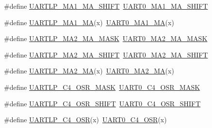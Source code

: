 \begin{DoxyCompactItemize}
\item 
\#define \hyperlink{group___backward___compatibility___symbols_ga62055de0c9859d4d9308b092e5fee5e9}{U\+A\+R\+T\+L\+P\+\_\+\+M\+A1\+\_\+\+M\+A\+\_\+\+S\+H\+I\+FT}~\hyperlink{group___u_a_r_t0___register___masks_ga97f0146ebe2278bfbb80f350bcb8f238}{U\+A\+R\+T0\+\_\+\+M\+A1\+\_\+\+M\+A\+\_\+\+S\+H\+I\+FT}
\item 
\#define \hyperlink{group___backward___compatibility___symbols_gae1c043e76d3e412ec723a033513ceac6}{U\+A\+R\+T\+L\+P\+\_\+\+M\+A1\+\_\+\+MA}(x)~\hyperlink{group___u_a_r_t0___register___masks_gad868c0319c33d444b3aac8c88f4132d3}{U\+A\+R\+T0\+\_\+\+M\+A1\+\_\+\+MA}(x)
\item 
\#define \hyperlink{group___backward___compatibility___symbols_gaf7ea6dd269e7c9e321d53599db756e75}{U\+A\+R\+T\+L\+P\+\_\+\+M\+A2\+\_\+\+M\+A\+\_\+\+M\+A\+SK}~\hyperlink{group___u_a_r_t0___register___masks_ga92464fbb6ee7662411228e760fab58d3}{U\+A\+R\+T0\+\_\+\+M\+A2\+\_\+\+M\+A\+\_\+\+M\+A\+SK}
\item 
\#define \hyperlink{group___backward___compatibility___symbols_ga85f77220a0349e3a2862f9d08f670133}{U\+A\+R\+T\+L\+P\+\_\+\+M\+A2\+\_\+\+M\+A\+\_\+\+S\+H\+I\+FT}~\hyperlink{group___u_a_r_t0___register___masks_gab09c5cd573077ea52dd66656d8b4157d}{U\+A\+R\+T0\+\_\+\+M\+A2\+\_\+\+M\+A\+\_\+\+S\+H\+I\+FT}
\item 
\#define \hyperlink{group___backward___compatibility___symbols_ga49450a92c02a7d5af71ec00dc7e8ab3f}{U\+A\+R\+T\+L\+P\+\_\+\+M\+A2\+\_\+\+MA}(x)~\hyperlink{group___u_a_r_t0___register___masks_gaa7fad2b5aec1b6016bbf92af7e66d08c}{U\+A\+R\+T0\+\_\+\+M\+A2\+\_\+\+MA}(x)
\item 
\#define \hyperlink{group___backward___compatibility___symbols_gac6bfd7069bc2ce77d0aff3aecdd3d330}{U\+A\+R\+T\+L\+P\+\_\+\+C4\+\_\+\+O\+S\+R\+\_\+\+M\+A\+SK}~\hyperlink{group___u_a_r_t0___register___masks_gaf0fa80f61dd1507cc4e5383553ec1182}{U\+A\+R\+T0\+\_\+\+C4\+\_\+\+O\+S\+R\+\_\+\+M\+A\+SK}
\item 
\#define \hyperlink{group___backward___compatibility___symbols_gafb1dd8f9e942cb49f32e0be294bee876}{U\+A\+R\+T\+L\+P\+\_\+\+C4\+\_\+\+O\+S\+R\+\_\+\+S\+H\+I\+FT}~\hyperlink{group___u_a_r_t0___register___masks_ga4c95a628d79af511aa40f6dfca1bb7f5}{U\+A\+R\+T0\+\_\+\+C4\+\_\+\+O\+S\+R\+\_\+\+S\+H\+I\+FT}
\item 
\#define \hyperlink{group___backward___compatibility___symbols_gaa2d2ca8670df8b5afd119267a50ee9d7}{U\+A\+R\+T\+L\+P\+\_\+\+C4\+\_\+\+O\+SR}(x)~\hyperlink{group___u_a_r_t0___register___masks_gaa4a674d646973acd2cf8c42c70d854c2}{U\+A\+R\+T0\+\_\+\+C4\+\_\+\+O\+SR}(x)

\end{DoxyCompactItemize}
